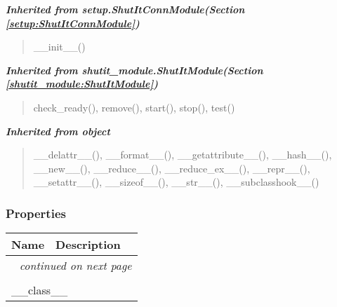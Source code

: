 \large{\textbf{\textit{Inherited from setup.ShutItConnModule\textit{(Section \ref{setup:ShutItConnModule})}}}}

\begin{quote}
\_\_init\_\_()
\end{quote}

\large{\textbf{\textit{Inherited from shutit\_module.ShutItModule\textit{(Section \ref{shutit_module:ShutItModule})}}}}

\begin{quote}
check\_ready(), remove(), start(), stop(), test()
\end{quote}

\large{\textbf{\textit{Inherited from object}}}

\begin{quote}
\_\_delattr\_\_(), \_\_format\_\_(), \_\_getattribute\_\_(), \_\_hash\_\_(), \_\_new\_\_(), \_\_reduce\_\_(), \_\_reduce\_ex\_\_(), \_\_repr\_\_(), \_\_setattr\_\_(), \_\_sizeof\_\_(), \_\_str\_\_(), \_\_subclasshook\_\_()
\end{quote}


  \subsubsection{Properties}

    \vspace{-1cm}
\hspace{\varindent}\begin{longtable}{|p{\varnamewidth}|p{\vardescrwidth}|l}
\cline{1-2}
\cline{1-2} \centering \textbf{Name} & \centering \textbf{Description}& \\
\cline{1-2}
\endhead\cline{1-2}\multicolumn{3}{r}{\small\textit{continued on next page}}\\\endfoot\cline{1-2}
\endlastfoot\multicolumn{2}{|l|}{\textit{Inherited from object}}\\
\multicolumn{2}{|p{\varwidth}|}{\raggedright \_\_class\_\_}\\
\cline{1-2}
\end{longtable}



